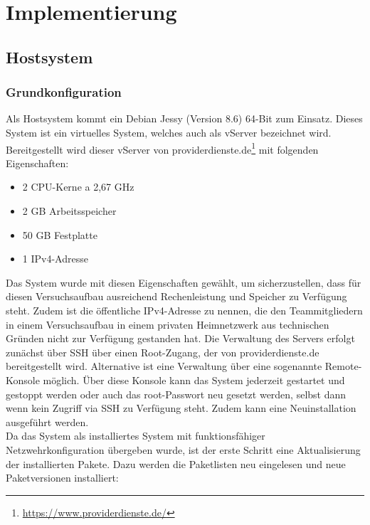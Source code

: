 \chapter{Implementierung}
\label{ch:Implementierung}

\section{Hostsystem}
\label{sec:Hostsystem}

\subsection{Grundkonfiguration}
\label{subsec:Grundkonfiguration}

Als Hostsystem kommt ein Debian Jessy (Version 8.6) 64-Bit zum Einsatz. Dieses System ist ein virtuelles System, welches auch als vServer bezeichnet wird. Bereitgestellt wird dieser vServer von providerdienste.de\footnote{\url{https://www.providerdienste.de/}} mit folgenden Eigenschaften:

\begin{itemize}
\item 2 CPU-Kerne a 2,67 GHz
\item 2 GB Arbeitsspeicher
\item 50 GB Festplatte
\item 1 IPv4-Adresse
\end{itemize}

Das System wurde mit diesen Eigenschaften gewählt, um sicherzustellen, dass für diesen Versuchsaufbau ausreichend Rechenleistung und Speicher zu Verfügung steht. Zudem ist die öffentliche IPv4-Adresse zu nennen, die den Teammitgliedern in einem Versuchsaufbau in einem privaten Heimnetzwerk aus technischen Gründen nicht zur Verfügung gestanden hat. Die Verwaltung des Servers erfolgt zunächst über SSH über einen Root-Zugang, der von providerdienste.de bereitgestellt wird.
Alternative ist eine Verwaltung über eine sogenannte Remote-Konsole möglich. Über diese Konsole  kann das System jederzeit gestartet und gestoppt werden oder auch das root-Passwort neu gesetzt werden, selbst dann wenn kein Zugriff via SSH zu Verfügung steht. Zudem kann eine Neuinstallation ausgeführt werden.\\

Da das System als installiertes System mit funktionsfähiger Netzwehrkonfiguration übergeben wurde, ist der erste Schritt eine Aktualisierung der installierten Pakete. Dazu werden die Paketlisten neu eingelesen und neue Paketversionen installiert:

